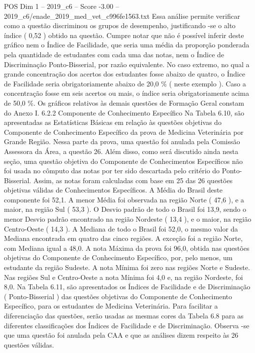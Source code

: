 \begin{textsample}{POS Dim 1 – 2019\_c6 – Score -3.00 – 2019\_c6/enade\_2019\_med\_vet\_c996fe1563.txt}
Essa análise permite verificar como a questão discriminou os grupos de desempenho, justificando -se o alto índice ( 0,52 ) obtido na questão.
Cumpre notar que não é possível inferir deste gráfico nem o Índice de Facilidade, que seria uma média da proporção ponderada pela quantidade de estudantes com cada uma das notas, nem o Índice de Discriminação Ponto-Bisserial, por razão equivalente.
No caso extremo, no qual a grande concentração dos acertos dos estudantes fosse abaixo de quatro, o Índice de Facilidade seria obrigatoriamente abaixo de 20,0 \% ( neste exemplo ).
Caso a concentração fosse em seis acertos ou mais, o índice seria obrigatoriamente acima de 50,0 \%.
Os gráficos relativos às demais questões de Formação Geral constam do Anexo I. 6.2.2 Componente de Conhecimento Específico Na Tabela 6.10, são apresentadas as Estatísticas Básicas em relação às questões objetivas do Componente de Conhecimento Específico da prova de Medicina Veterinária por Grande Região.
Nessa parte da prova, uma questão foi anulada pela Comissão Assessora da Área, a questão 26.
Além disso, como será discutido ainda nesta seção, uma questão objetiva do Componente de Conhecimentos Específicos não foi usada no cômputo das notas por ter sido descartada pelo critério do Ponto-Bisserial.
Assim, as notas foram calculadas com base em 25 das 26 questões objetivas válidas de Conhecimentos Específicos.
A Média do Brasil deste componente foi 52,1.
A menor Média foi observada na região Norte ( 47,6 ), e a maior, na região Sul ( 53,3 ).
O Desvio padrão de todo o Brasil foi 13,9, sendo o menor Desvio padrão encontrado na região Nordeste ( 13,4 ), e o maior, na região Centro-Oeste ( 14,3 ).
A Mediana de todo o Brasil foi 52,0, o mesmo valor da Mediana encontrada em quatro das cinco regiões.
A exceção foi a região Norte, com Mediana igual a 48,0.
A nota Máxima da prova foi 96,0, obtida nas questões objetivas do Componente de Conhecimento Específico, por, pelo menos, um estudante da região Sudeste.
A nota Mínima foi zero nas regiões Norte e Sudeste.
Nas regiões Sul e Centro-Oeste a nota Mínima foi 4,0 e, na região Nordeste, foi 8,0.
Na Tabela 6.11, são apresentados os Índices de Facilidade e de Discriminação ( Ponto-Bisserial ) das questões objetivas do Componente de Conhecimento Específico, para os estudantes de Medicina Veterinária.
Para facilitar a diferenciação das questões, serão usadas as mesmas cores da Tabela 6.8 para as diferentes classificações dos Índices de Facilidade e de Discriminação.
Observa -se que uma questão foi anulada pela CAA e que as análises dizem respeito às 26 questões válidas.

\end{textsample}
